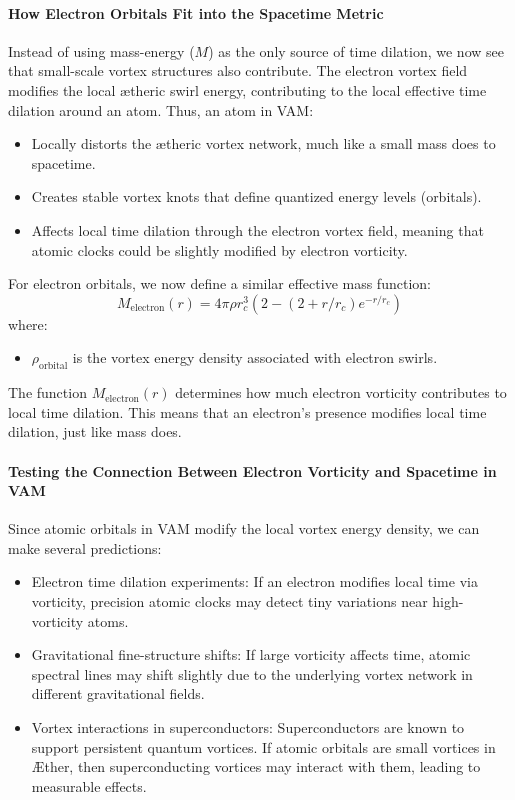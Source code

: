 \paragraph{How Electron Orbitals Fit into the Spacetime Metric}
Instead of using mass-energy ($M$) as the only source of time dilation, we now see that small-scale vortex structures also contribute.
The electron vortex field modifies the local ætheric swirl energy, contributing to the local effective time dilation around an atom.
Thus, an atom in VAM:
\begin{itemize}
    \item Locally distorts the ætheric vortex network, much like a small mass does to spacetime.
    \item Creates stable vortex knots that define quantized energy levels (orbitals).
    \item Affects local time dilation through the electron vortex field, meaning that atomic clocks could be slightly modified by electron vorticity.
\end{itemize}
For electron orbitals, we now define a similar effective mass function:
\begin{equation*}
    M_\text{electron}(r)=4 \pi \rho r_c^3  \left( 2 - (2 + r/r_c) e^{-r / r_c} \right)
\end{equation*}
where:
\begin{itemize}
    \item $\rho_\text{orbital}$ is the vortex energy density associated with electron swirls.
\end{itemize}
The function $M_\text{electron}(r)$ determines how much electron vorticity contributes to local time dilation.
This means that an electron’s presence modifies local time dilation, just like mass does.

\paragraph{Testing the Connection Between Electron Vorticity and Spacetime in VAM}
Since atomic orbitals in VAM modify the local vortex energy density, we can make several predictions:
\begin{itemize}
    \item Electron time dilation experiments: If an electron modifies local time via vorticity, precision atomic clocks may detect tiny variations near high-vorticity atoms.
    \item Gravitational fine-structure shifts: If large vorticity affects time, atomic spectral lines may shift slightly due to the underlying vortex network in different gravitational fields.
    \item Vortex interactions in superconductors: Superconductors are known to support persistent quantum vortices. If atomic orbitals are small vortices in Æther, then superconducting vortices may interact with them, leading to measurable effects.
\end{itemize}

